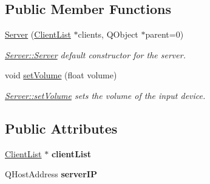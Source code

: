 \subsection*{Public Member Functions}
\begin{DoxyCompactItemize}
\item 
\hyperlink{class_server_a5132484423532e71a8836c520f340e0a}{Server} (\hyperlink{class_client_list}{Client\+List} $\ast$clients, Q\+Object $\ast$parent=0)
\begin{DoxyCompactList}\small\item\em \hyperlink{class_server_a5132484423532e71a8836c520f340e0a}{Server\+::\+Server} default constructor for the server. \end{DoxyCompactList}\item 
void \hyperlink{class_server_a8dda22fb0d54f1ad3eb9c69017d98493}{set\+Volume} (float volume)
\begin{DoxyCompactList}\small\item\em \hyperlink{class_server_a8dda22fb0d54f1ad3eb9c69017d98493}{Server\+::set\+Volume} sets the volume of the input device. \end{DoxyCompactList}\end{DoxyCompactItemize}
\subsection*{Public Attributes}
\begin{DoxyCompactItemize}
\item 
\hypertarget{class_server_af1a9716febd17e14cce48a4ae2a0bce7}{\hyperlink{class_client_list}{Client\+List} $\ast$ {\bfseries client\+List}}\label{class_server_af1a9716febd17e14cce48a4ae2a0bce7}

\item 
\hypertarget{class_server_a23214ead7157ba34b1700434bf4ea8bd}{Q\+Host\+Address {\bfseries server\+I\+P}}\label{class_server_a23214ead7157ba34b1700434bf4ea8bd}

\end{DoxyCompactItemize}
